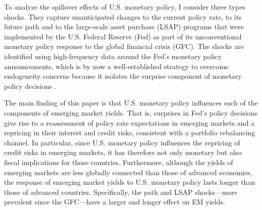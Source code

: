 {To analyze the spillover effects of U.S. monetary policy, I consider
three types shocks.
They capture unanticipated changes to the current policy rate, to its future path and 
to the large-scale asset purchase (LSAP) programs that were implemented by the U.S. Federal Reserve (Fed) as part of its unconventional monetary policy response to the global financial crisis (GFC).
The shocks are identified using high-frequency data around the Fed's monetary policy announcements, which is by now a well-established strategy to overcome endogeneity concerns because it isolates the surprise component of monetary policy decisions \citep{GurkaynakWright:2013,NakamuraSteinsson:2018JEP}.

The main finding of this paper is that U.S. monetary policy influences each of the components of emerging market yields.
That is, surprises in Fed's policy decisions give rise to a reassessment of policy rate expectations in emerging markets and a repricing in their interest and credit risks, consistent with a portfolio rebalancing channel.
In particular, since U.S. monetary policy influences the repricing of credit risks  in emerging markets, it has therefore not only monetary but also fiscal implications for those countries.
Furthermore, although the yields of emerging markets are less globally connected than those of advanced economies, the response of emerging market yields to U.S. monetary policy lasts longer than those of advanced countries.
Specifically, the path and LSAP shocks---more prevalent since the GFC---have a larger and longer effect on EM yields. 

}
